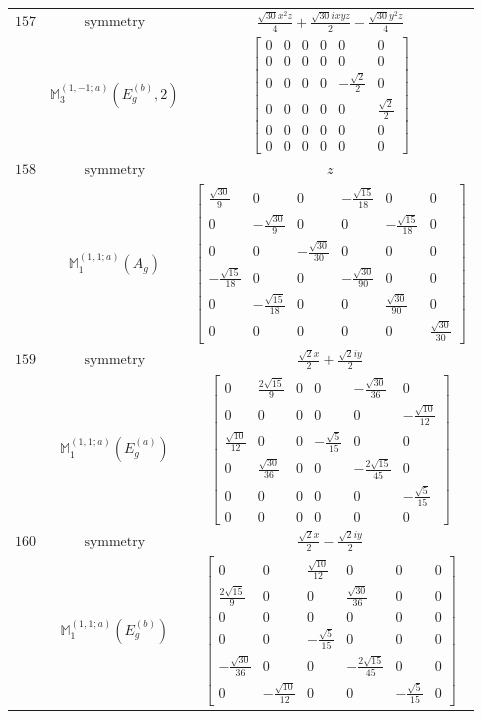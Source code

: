 \documentclass[fleqn,8pt,landscape]{jsarticle}
\begin{document}
\begin{longtable}{ccc}
$ 157 $ & $ \text{symmetry} $ & $ \frac{\sqrt{30} x^{2} z}{4} + \frac{\sqrt{30} i x y z}{2} - \frac{\sqrt{30} y^{2} z}{4} $ \\
$  $ & $ \mathbb{M}_{3}^{(1,-1;a)}(E_{g}^{(b)},2) $ & $ \begin{bmatrix} 0 & 0 & 0 & 0 & 0 & 0 \\ 0 & 0 & 0 & 0 & 0 & 0 \\ 0 & 0 & 0 & 0 & - \frac{\sqrt{2}}{2} & 0 \\ 0 & 0 & 0 & 0 & 0 & \frac{\sqrt{2}}{2} \\ 0 & 0 & 0 & 0 & 0 & 0 \\ 0 & 0 & 0 & 0 & 0 & 0 \end{bmatrix} $ \\ \hline
$ 158 $ & $ \text{symmetry} $ & $ z $ \\
$  $ & $ \mathbb{M}_{1}^{(1,1;a)}(A_{g}) $ & $ \begin{bmatrix} \frac{\sqrt{30}}{9} & 0 & 0 & - \frac{\sqrt{15}}{18} & 0 & 0 \\ 0 & - \frac{\sqrt{30}}{9} & 0 & 0 & - \frac{\sqrt{15}}{18} & 0 \\ 0 & 0 & - \frac{\sqrt{30}}{30} & 0 & 0 & 0 \\ - \frac{\sqrt{15}}{18} & 0 & 0 & - \frac{\sqrt{30}}{90} & 0 & 0 \\ 0 & - \frac{\sqrt{15}}{18} & 0 & 0 & \frac{\sqrt{30}}{90} & 0 \\ 0 & 0 & 0 & 0 & 0 & \frac{\sqrt{30}}{30} \end{bmatrix} $ \\ \hline
$ 159 $ & $ \text{symmetry} $ & $ \frac{\sqrt{2} x}{2} + \frac{\sqrt{2} i y}{2} $ \\
$  $ & $ \mathbb{M}_{1}^{(1,1;a)}(E_{g}^{(a)}) $ & $ \begin{bmatrix} 0 & \frac{2 \sqrt{15}}{9} & 0 & 0 & - \frac{\sqrt{30}}{36} & 0 \\ 0 & 0 & 0 & 0 & 0 & - \frac{\sqrt{10}}{12} \\ \frac{\sqrt{10}}{12} & 0 & 0 & - \frac{\sqrt{5}}{15} & 0 & 0 \\ 0 & \frac{\sqrt{30}}{36} & 0 & 0 & - \frac{2 \sqrt{15}}{45} & 0 \\ 0 & 0 & 0 & 0 & 0 & - \frac{\sqrt{5}}{15} \\ 0 & 0 & 0 & 0 & 0 & 0 \end{bmatrix} $ \\ \hline
$ 160 $ & $ \text{symmetry} $ & $ \frac{\sqrt{2} x}{2} - \frac{\sqrt{2} i y}{2} $ \\
$  $ & $ \mathbb{M}_{1}^{(1,1;a)}(E_{g}^{(b)}) $ & $ \begin{bmatrix} 0 & 0 & \frac{\sqrt{10}}{12} & 0 & 0 & 0 \\ \frac{2 \sqrt{15}}{9} & 0 & 0 & \frac{\sqrt{30}}{36} & 0 & 0 \\ 0 & 0 & 0 & 0 & 0 & 0 \\ 0 & 0 & - \frac{\sqrt{5}}{15} & 0 & 0 & 0 \\ - \frac{\sqrt{30}}{36} & 0 & 0 & - \frac{2 \sqrt{15}}{45} & 0 & 0 \\ 0 & - \frac{\sqrt{10}}{12} & 0 & 0 & - \frac{\sqrt{5}}{15} & 0 \end{bmatrix} $ \\ \hline
\end{longtable}
\end{document}
